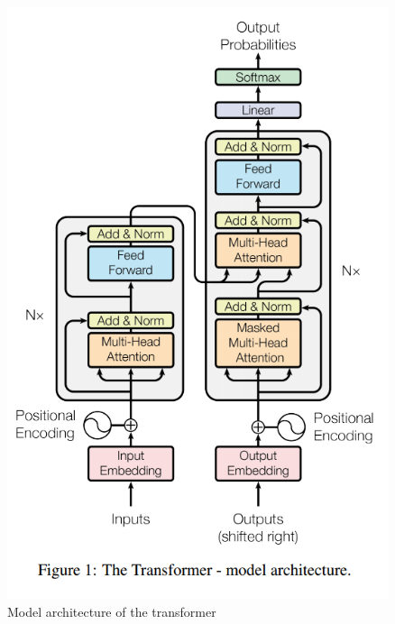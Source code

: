 \documentclass{assignment format}
\begin{document}
\begin{figure}[h]
\centering
\captionsetup{justification=centering,margin=2cm}
\includegraphics[width=0.35\linewidth]{transformer.png}
\caption{Model architecture of the transformer}
\label{transformer}
\end{figure}
\end{document}
